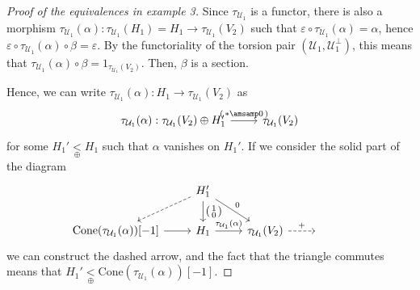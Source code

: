 \begin{proof}[Proof of the equivalences in example 3]
  Since $\tau_{\mathcal{U}_1}$ is a functor, there is also a morphism
  $\tau_{\mathcal{U}_1}(\alpha):\tau_{\mathcal{U}_1}(H_1)=H_1\to \tau_{\mathcal{U}_1}(V_2)$ such that
  $\varepsilon\circ\tau_{\mathcal{U}_1}(\alpha)=\alpha$, hence
  $\varepsilon\circ\tau_{\mathcal{U}_1}(\alpha)\circ\beta = \varepsilon$. By the functoriality of
  the torsion pair $(\mathcal{U}_1,\mathcal{U}_1^\perp)$, this means that
  $\tau_{\mathcal{U}_1}(\alpha)\circ\beta=1_{\tau_{\mathcal{U}_1}(V_2)}$. Then, $\mathcal{\beta}$ is a section.

  Hence, we can write $\tau_{\mathcal{U}_1}(\alpha):H_1\to \tau_{\mathcal{U}_1}(V_2)$
  as
  \begin{equation*}
    \begin{tikzcd}
      \tau_{\mathcal{U}_1}(\alpha):\tau_{\mathcal{U}_1}(V_2)\oplus H_1'
      \arrow{r}{
          \begin{psmallmatrix}
            \ast \amsamp 0
          \end{psmallmatrix}
          }
        & \tau_{\mathcal{U}_1}(V_2)
    \end{tikzcd}
  \end{equation*}
  for some $H_1'\underset{\oplus}{<} H_1$ such that
  $\alpha$ vanishes on $H_1'$. If we consider the solid part of the diagram
  \begin{equation*}
    \begin{tikzcd}
      & H_1'\arrow[dashed]{dl}
      \arrow{d}{
        \begin{psmallmatrix}
          1 \\ 0
        \end{psmallmatrix}
      }\arrow{dr}{0}
        & & &\\
      \mathrm{Cone}(\tau_{\mathcal{U}_1}(\alpha))[-1]\arrow{r}
        & H_1\arrow{r}{\tau_{\mathcal{U}_1}(\alpha)}
          & \tau_{\mathcal{U}_1}(V_2)\arrow[dashed]{r}{+}
            & {}
    \end{tikzcd}
  \end{equation*}
  we can construct the dashed arrow, and the fact that the triangle commutes means
  that $H_1'\underset{\oplus}{<}\mathrm{Cone}(\tau_{\mathcal{U}_1}(\alpha))[-1]$.


\end{proof}
